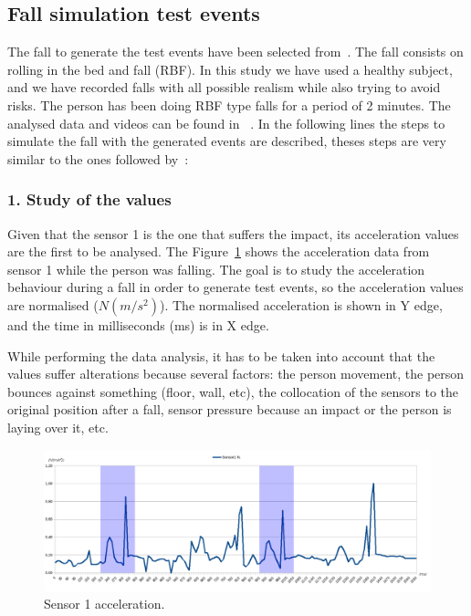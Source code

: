 \documentclass[review]{elsarticle}
\begin{document}
\subsection{Fall simulation test events} 

The fall to generate the test events have been selected from~\cite{Li2009,Pannurat2014}. 
The fall consists on rolling in the bed and fall (RBF). In this study we have used a 
healthy subject, and we have recorded falls with all possible realism while also
trying to avoid risks. The person has been doing RBF type falls for a period of 2 minutes. The analysed 
data and videos can be found in ~\cite{FallRepo}. In the following lines the steps to simulate 
the fall with the generated events are described, theses steps are very similar to the 
ones followed by~\cite{colladomachine,colladoTriaxal}:

\subsubsection*{1. Study of the values} Given that the sensor 1 is the one that suffers the
impact, its acceleration values are the first to be analysed. The Figure~\ref{fig:Sensor1Sombras} 
shows the acceleration data from sensor 1 while the person was falling. The goal is to study 
the acceleration behaviour during a fall in order to generate test events, so the acceleration 
values are normalised ($N(m/s^2)$). The normalised acceleration is shown in Y edge, and the 
time in milliseconds (ms) is in X edge.

While performing the data analysis, it has to be taken into account that the values suffer 
alterations because several factors: the person movement, the person bounces against something 
(floor, wall, etc), the collocation of the sensors to the original position after a fall, 
sensor pressure because an impact or the person is laying over it, etc.

 \begin{figure}[!ht]
  \includegraphics[scale=0.255]{img/Sensor1Sombras}
  \caption[Sensor 1 acceleration]{Sensor 1 acceleration.}
  \label{fig:Sensor1Sombras}
\end{figure}
\end{document}
